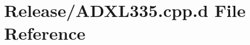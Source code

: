 \hypertarget{_release_2_a_d_x_l335_8cpp_8d}{\section{\-Release/\-A\-D\-X\-L335.cpp.\-d \-File \-Reference}
\label{_release_2_a_d_x_l335_8cpp_8d}
}
